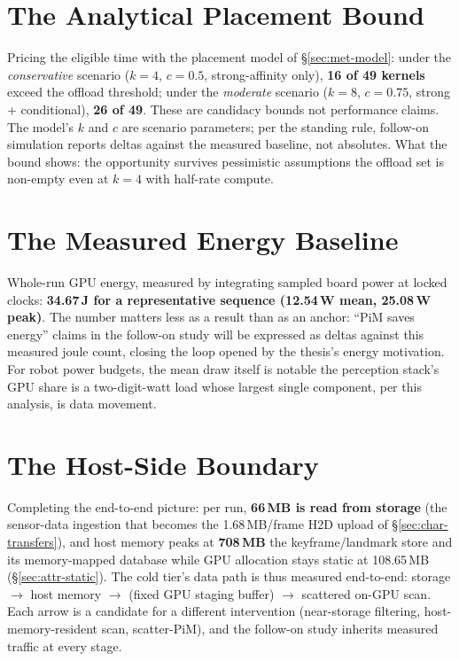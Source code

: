 \section{The Analytical Placement Bound}
\label{sec:syn-model}

Pricing the eligible time with the placement model of \S\ref{sec:met-model}: under the \emph{conservative} scenario ($k{=}4$, $c{=}0.5$, strong-affinity only), \textbf{16 of 49 kernels} exceed the offload threshold; under the \emph{moderate} scenario ($k{=}8$, $c{=}0.75$, strong + conditional), \textbf{26 of 49}. These are candidacy bounds not performance claims. The model's $k$ and $c$ are scenario parameters; per the standing rule, follow-on simulation reports deltas against the measured baseline, not absolutes. What the bound shows: the opportunity survives pessimistic assumptions the offload set is non-empty even at $k{=}4$ with half-rate compute.

\section{The Measured Energy Baseline}
\label{sec:syn-energy}

Whole-run GPU energy, measured by integrating sampled board power at locked clocks: \textbf{34.67\,J for a representative sequence (12.54\,W mean, 25.08\,W peak)}. The number matters less as a result than as an anchor: “PiM saves energy” claims in the follow-on study will be expressed as deltas against this measured joule count, closing the loop opened by the thesis’s energy motivation. For robot power budgets, the mean draw itself is notable the perception stack’s GPU share is a two-digit-watt load whose largest single component, per this analysis, is data movement.

\section{The Host-Side Boundary}
\label{sec:syn-host}

Completing the end-to-end picture: per run, \textbf{66\,MB is read from storage} (the sensor-data ingestion that becomes the 1.68\,MB/frame H2D upload of \S\ref{sec:char-transfers}), and host memory peaks at \textbf{708\,MB} the keyframe/landmark store and its memory-mapped database while GPU allocation stays static at 108.65\,MB (\S\ref{sec:attr-static}). The cold tier’s data path is thus measured end-to-end: storage $\rightarrow$ host memory $\rightarrow$ (fixed GPU staging buffer) $\rightarrow$ scattered on-GPU scan. Each arrow is a candidate for a different intervention (near-storage filtering, host-memory-resident scan, scatter-PiM), and the follow-on study inherits measured traffic at every stage.

